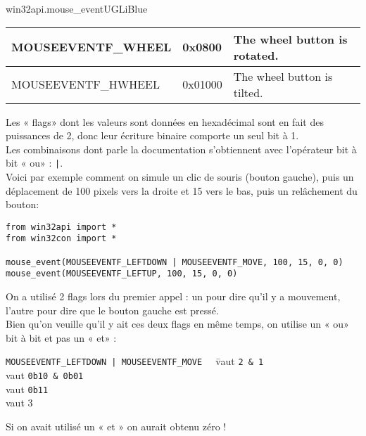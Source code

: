 \documentclass[a4paper,10pt,cours,firamath]{nsi}
\begin{document}
\begin{encadrecolore}{win32api.mouse\_event}{UGLiBlue}
\begin{center}
\begin{tabularx}{\textwidth}{|X|X|X|}
			MOUSEEVENTF\_WHEEL          & 
			0x0800                      & 
			The wheel button is rotated.                                                                                                                                                                                                                                                                                                                                                                                                                                                      \\\hline
			MOUSEEVENTF\_HWHEEL         & 
			0x01000                     & 
			The wheel button is tilted.                                                                                                                                                                                                                                                                                                                                                                                                                                                       \\\hline
		\end{tabularx}
	\end{center}
\end{encadrecolore}
Les « flags» dont les valeurs sont données en hexadécimal sont en fait des puissances de 2, donc leur écriture binaire comporte un seul bit à 1.\\
Les combinaisons dont parle la documentation s'obtiennent avec l'opérateur bit à bit « ou» : \texttt{|}.\\
Voici par exemple comment on simule un clic de souris (bouton gauche), puis un déplacement de 100 pixels vers la droite et 15 vers le bas, puis un relâchement du bouton:

\begin{pyc}
	\begin{verbatim}
from win32api import *
from win32con import *

mouse_event(MOUSEEVENTF_LEFTDOWN | MOUSEEVENTF_MOVE, 100, 15, 0, 0)
mouse_event(MOUSEEVENTF_LEFTUP, 100, 15, 0, 0)
\end{verbatim}
\end{pyc}

\begin{remarque}[]
	On a utilisé 2 flags lors du premier appel : un pour dire qu'il y a mouvement, l'autre pour dire que le bouton gauche est pressé.\\
	Bien qu'on veuille qu'il y ait ces deux flags en même temps, on utilise un « ou» bit à bit et pas un « et» :
	\begin{tabbing}
		\texttt{MOUSEEVENTF\_LEFTDOWN | MOUSEEVENTF\_MOVE\ \ } \= vaut \texttt{2 \& 1}\\
		\> vaut \texttt{0b10 \& 0b01}\\
		\> vaut \texttt{0b11}\\
		\> vaut 3
	\end{tabbing}
	Si on avait utilisé un « et »  on aurait obtenu zéro !
\end{remarque}
\end{document}
